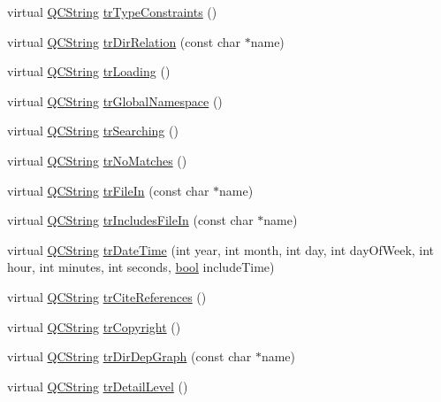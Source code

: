 \begin{DoxyCompactItemize}
\item 
virtual \hyperlink{class_q_c_string}{Q\+C\+String} \hyperlink{class_translator_dutch_a27f6a6b19fd8b97867808ad55be5edd9}{tr\+Type\+Constraints} ()
\item 
virtual \hyperlink{class_q_c_string}{Q\+C\+String} \hyperlink{class_translator_dutch_ac039a8666db97c31698cc70e450821ad}{tr\+Dir\+Relation} (const char $\ast$name)
\item 
virtual \hyperlink{class_q_c_string}{Q\+C\+String} \hyperlink{class_translator_dutch_a7bd89c322b5c702e4807d45c9fdfa946}{tr\+Loading} ()
\item 
virtual \hyperlink{class_q_c_string}{Q\+C\+String} \hyperlink{class_translator_dutch_a65e402eac00bb3e5f34557bcd7da61d3}{tr\+Global\+Namespace} ()
\item 
virtual \hyperlink{class_q_c_string}{Q\+C\+String} \hyperlink{class_translator_dutch_aefc546c44e62a94715e808485573a565}{tr\+Searching} ()
\item 
virtual \hyperlink{class_q_c_string}{Q\+C\+String} \hyperlink{class_translator_dutch_a6398b14c41888622c97f15957c609141}{tr\+No\+Matches} ()
\item 
virtual \hyperlink{class_q_c_string}{Q\+C\+String} \hyperlink{class_translator_dutch_a6800d32bd5646807f9bec6194b79a11e}{tr\+File\+In} (const char $\ast$name)
\item 
virtual \hyperlink{class_q_c_string}{Q\+C\+String} \hyperlink{class_translator_dutch_acc4990897794e3f5a18bb1e1731b472a}{tr\+Includes\+File\+In} (const char $\ast$name)
\item 
virtual \hyperlink{class_q_c_string}{Q\+C\+String} \hyperlink{class_translator_dutch_a040430d74361c3d66ee0c4e87168c9bc}{tr\+Date\+Time} (int year, int month, int day, int day\+Of\+Week, int hour, int minutes, int seconds, \hyperlink{qglobal_8h_a1062901a7428fdd9c7f180f5e01ea056}{bool} include\+Time)
\item 
virtual \hyperlink{class_q_c_string}{Q\+C\+String} \hyperlink{class_translator_dutch_a7dcbb963bda45717faff39aceda64f9b}{tr\+Cite\+References} ()
\item 
virtual \hyperlink{class_q_c_string}{Q\+C\+String} \hyperlink{class_translator_dutch_ab7c37e72e5ff7bf579cfa1ee13de13e9}{tr\+Copyright} ()
\item 
virtual \hyperlink{class_q_c_string}{Q\+C\+String} \hyperlink{class_translator_dutch_a8c004f960001b878331abb3cc622dd1a}{tr\+Dir\+Dep\+Graph} (const char $\ast$name)
\item 
virtual \hyperlink{class_q_c_string}{Q\+C\+String} \hyperlink{class_translator_dutch_ac52d115b615423a09db774a5dcf609ae}{tr\+Detail\+Level} ()

\end{DoxyCompactItemize}
